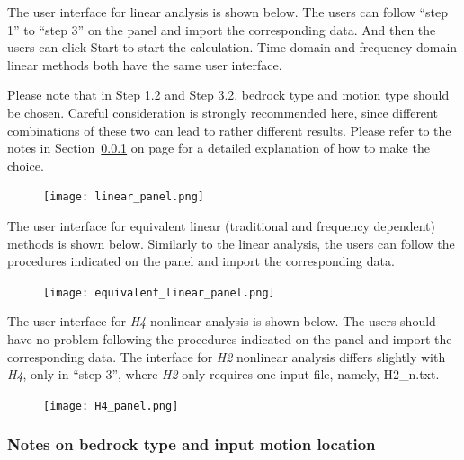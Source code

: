 \documentclass[11pt,letterpaper]{article}
\begin{document}
The user interface for linear analysis is shown below. The users can follow ``step 1'' to ``step 3'' on the panel and import the corresponding data. And then the users can click \textsf{Start} to start the calculation. Time-domain and frequency-domain linear methods both have the same user interface.

Please note that in Step 1.2 and Step 3.2, bedrock type and motion type should be chosen. Careful consideration is strongly recommended here, since different combinations of these two can lead to rather different results.  Please refer to the notes in Section~\ref{sec:bedrock-type-and-motion-location} on page \pageref{sec:bedrock-type-and-motion-location} for a detailed explanation of how to make the choice.

\begin{figure}[H]
\centering
  \texttt{[image: linear\_panel.png]}\\
\end{figure}


\newpage
The user interface for equivalent linear (traditional and frequency dependent) methods is shown below. Similarly to the linear analysis, the users can follow the procedures indicated on the panel and import the corresponding data.

\begin{figure}[H]
\centering
  \texttt{[image: equivalent\_linear\_panel.png]}\\
\end{figure}

\newpage
The user interface for \emph{H4} nonlinear analysis is shown below. The users should have no problem following the procedures indicated on the panel and import the corresponding data. The interface for \emph{H2} nonlinear analysis differs slightly with \emph{H4}, only in ``step 3'', where \emph{H2} only requires one input file, namely, \textsf{H2\_n.txt}.

\begin{figure}[H]
\centering
  \texttt{[image: H4\_panel.png]}\\
\end{figure}


\newpage
\subsubsection{Notes on bedrock type and input motion location}\label{sec:bedrock-type-and-motion-location}
\end{document}
